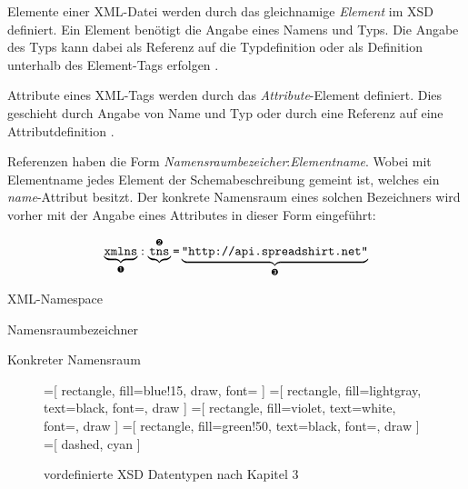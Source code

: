 Elemente einer \gls{XML}-Datei werden durch das gleichnamige \emph{Element}  im \gls{XSD} definiert. Ein Element benötigt die Angabe eines Namens und Typs. Die Angabe des Typs kann dabei als Referenz auf die Typdefinition  oder als Definition unterhalb des Element-Tags erfolgen .

Attribute eines \gls{XML}-Tags werden durch das \emph{Attribute}-Element definiert. Dies geschieht durch Angabe von Name und Typ  oder durch eine Referenz auf eine Attributdefinition .

Referenzen haben die Form \emph{Namensraumbezeicher}:\emph{Elementname}. Wobei mit Elementname jedes Element der Schemabeschreibung gemeint ist, welches ein \emph{name}-Attribut besitzt. Der konkrete Namensraum eines solchen Bezeichners wird vorher mit der Angabe eines Attributes in dieser Form eingeführt:

\[  
    \underbrace{\text{\texttt{xmlns}}}_{\text{\ding{202}}}
    :
    \underbrace{\text{\texttt{tns}}}^{\text{\ding{203}}}
    \texttt{=}
    \underbrace{
        \texttt{"http://api.spreadshirt.net"}
    }_{\text{\ding{204}}}
\]

\begin{compactitem}
    \item[\ding{202}] \gls{XML}-Namespace
    \item[\ding{203}] Namensraumbezeichner
    \item[\ding{204}] Konkreter Namensraum
\end{compactitem}

\begin{sidewaysfigure}
    \centering
    =[
        rectangle,
        fill={blue!15},
        draw,
        font=\sffamily
    ]      
    =[
        rectangle,
        fill=lightgray,
        text=black,
        font=\sffamily,
        draw
    ]
    =[
        rectangle,
        fill=violet,
        text=white,
        font=\sffamily,
        draw
    ]
    =[
        rectangle,
        fill=green!50,
        text=black,
        font=\sffamily,
        draw
    ]
    =[
        dashed,
        cyan
    ]
    \resizebox{\textheight}{!}{
            
    }
    \vspace{\baselineskip}\\
    \resizebox{0.5\textheight}{!}{
            
    }        
    \caption{vordefinierte \gls{XSD} Datentypen nach \cite{XMLSchema11Specification} Kapitel 3}
    \label{fig:xsddatatypes}
\end{sidewaysfigure}